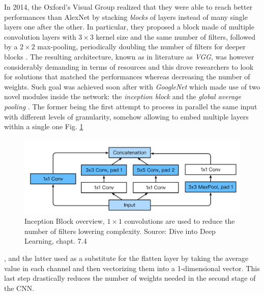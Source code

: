 \documentclass[LaM,binding=0.6cm]{./packages/sapthesis/sapthesis}
\begin{document}
        In 2014, the Oxford's Visual Group realized that they were able to reach better performances than AlexNet by stacking \textit{blocks} of layers instead of many 
        single layers one after the other. In particular, they proposed a block made of multiple convolution layers with $ 3 \times 3 $ kernel size and the same 
        number of filters, followed by a $ 2 \times 2 $ max-pooling, periodically doubling the number of filters for deeper blocks \cite{vgg}. The resulting 
        architecture, known as in literature as \textit{VGG}, was however considerably demanding in terms of resources and this drove researchers to look 
        for solutions that matched the performances whereas decreasing the number of weights. Such goal was achieved soon after with \textit{GoogleNet}
        which made use of two novel modules inside the network: the \textit{inception block} and the \textit{global average pooling} \cite{googlenet}. The former 
        being the first attempt to process in parallel the same input with different levels of granularity, somehow allowing to embed multiple layers within a single
        one Fig. \ref{fig:inception}
        \begin{figure}[h!]
            \centering
            \includegraphics[scale=0.25]{inception}
            \caption{Inception Block overview, $1\times 1$ convolutions are used to reduce the number of filters lowering complexity. Source: Dive into Deep Learning, chapt. 7.4}
            \label{fig:inception}
        \end{figure}
        , and the latter used as a substitute for the flatten layer by taking the average value in each channel and then vectorizing them into a 1-dimensional vector. 
        This last step drastically reduces the number of weights needed in the second stage of the CNN. 
        
\end{document}
